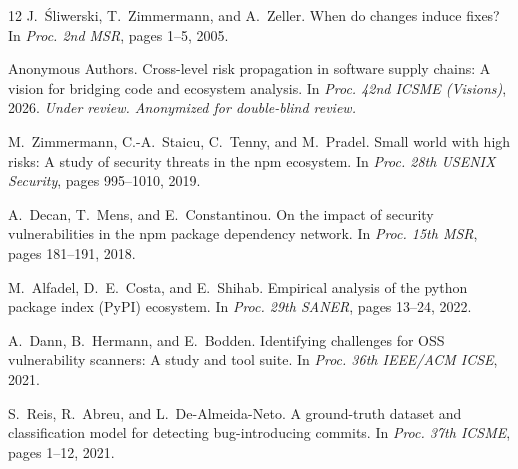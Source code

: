 \documentclass[sigconf,nonacm]{acmart}
\begin{document}
\begin{thebibliography}{12}
J.~{\'S}liwerski, T.~Zimmermann, and A.~Zeller.
\newblock When do changes induce fixes?
\newblock In \emph{Proc. 2nd MSR}, pages 1--5, 2005.

Anonymous Authors.
\newblock Cross-level risk propagation in software supply chains:
A vision for bridging code and ecosystem analysis.
\newblock In \emph{Proc. 42nd ICSME (Visions)}, 2026.
\newblock \emph{Under review. Anonymized for double-blind review.}

M.~Zimmermann, C.-A.~Staicu, C.~Tenny, and M.~Pradel.
\newblock Small world with high risks: A study of security threats in the 
npm ecosystem.
\newblock In \emph{Proc. 28th USENIX Security}, pages 995--1010, 2019.

A.~Decan, T.~Mens, and E.~Constantinou.
\newblock On the impact of security vulnerabilities in the npm package
dependency network.
\newblock In \emph{Proc. 15th MSR}, pages 181--191, 2018.

M.~Alfadel, D.~E.~Costa, and E.~Shihab.
\newblock Empirical analysis of the python package index (PyPI) ecosystem.
\newblock In \emph{Proc. 29th SANER}, pages 13--24, 2022.

A.~Dann, B.~Hermann, and E.~Bodden.
\newblock Identifying challenges for OSS vulnerability scanners: A study and
tool suite.
\newblock In \emph{Proc. 36th IEEE/ACM ICSE}, 2021.

S.~Reis, R.~Abreu, and L.~De-Almeida-Neto.
\newblock A ground-truth dataset and classification model for detecting
bug-introducing commits.
\newblock In \emph{Proc. 37th ICSME}, pages 1--12, 2021.

\end{thebibliography}
\end{document}
